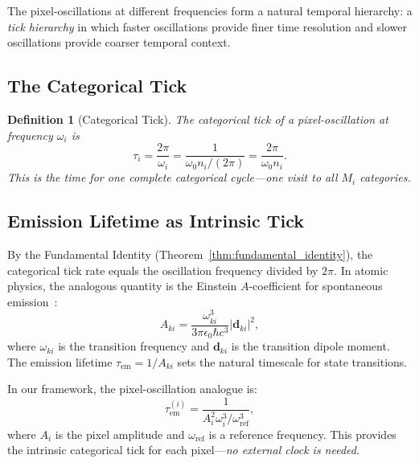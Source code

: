 \documentclass[11pt,twocolumn,a4paper]{article}
\newtheorem{definition}[theorem]{Definition}
\newcommand{\tauem}{\tau_{\mathrm{em}}}
\begin{document}

The pixel-oscillations at different frequencies form a natural temporal hierarchy: a \emph{tick hierarchy} in which faster oscillations provide finer time resolution and slower oscillations provide coarser temporal context.

\subsection{The Categorical Tick}

\begin{definition}[Categorical Tick]\label{def:categorical_tick}
The categorical tick of a pixel-oscillation at frequency $\omega_i$ is
\begin{equation}
    \tau_i = \frac{2\pi}{\omega_i} = \frac{1}{\omega_0 n_i / (2\pi)} = \frac{2\pi}{\omega_0 n_i}.
    \label{eq:categorical_tick}
\end{equation}
This is the time for one complete categorical cycle---one visit to all $M_i$ categories.
\end{definition}

\subsection{Emission Lifetime as Intrinsic Tick}

By the Fundamental Identity (Theorem~\ref{thm:fundamental_identity}), the categorical tick rate equals the oscillation frequency divided by $2\pi$. In atomic physics, the analogous quantity is the Einstein $A$-coefficient for spontaneous emission~\citep{einstein1917, dirac1927}:
\begin{equation}
    A_{ki} = \frac{\omega_{ki}^3}{3\pi \epsilon_0 \hbar c^3} |\bm{d}_{ki}|^2,
    \label{eq:A_coefficient}
\end{equation}
where $\omega_{ki}$ is the transition frequency and $\bm{d}_{ki}$ is the transition dipole moment. The emission lifetime $\tauem = 1/A_{ki}$ sets the natural timescale for state transitions.

In our framework, the pixel-oscillation analogue is:
\begin{equation}
    \tauem^{(i)} = \frac{1}{A_i^2 \omega_i^3 / \omega_{\text{ref}}^3},
    \label{eq:pixel_emission_lifetime}
\end{equation}
where $A_i$ is the pixel amplitude and $\omega_{\text{ref}}$ is a reference frequency. This provides the intrinsic categorical tick for each pixel---\emph{no external clock is needed}.
\end{document}
